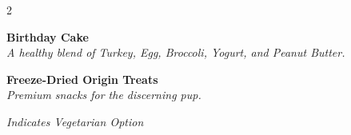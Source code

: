 \documentclass[a4paper,10pt]{article}
\newcommand{\veg}{\raisebox{-1pt}{\large\textleaf} }
\begin{document}
\begin{multicols}{2}
\begin{tcolorbox}[colback=white, colframe=black, sharp corners, boxrule=1pt, width=\linewidth]
        \vspace{0.2cm}
        \textbf{Birthday Cake} \\
        \textit{A healthy blend of Turkey, Egg, Broccoli, Yogurt, and Peanut Butter.}

        \vspace{0.1cm}
        \textbf{Freeze-Dried Origin Treats} \\
        \textit{Premium snacks for the discerning pup.}
    \end{tcolorbox}

    \vspace{0.3cm}
    \begin{center}
        \textit{\footnotesize \veg Indicates Vegetarian Option}
    \end{center}

\end{multicols}
\end{document}

